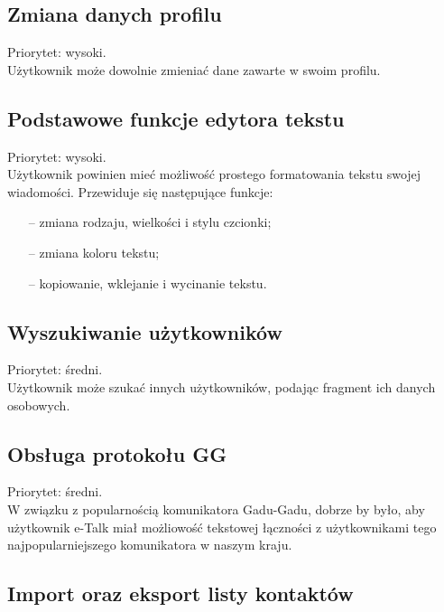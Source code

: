 \documentclass[a4paper,12pt]{article}
\begin{document}
\subsection[Zmiana danych profilu]{Zmiana danych profilu}

Priorytet: wysoki.\\

Użytkownik może dowolnie zmieniać dane zawarte w swoim profilu.

\subsection[Podstawowe funkcje edytora tekstu]{Podstawowe funkcje edytora tekstu}

Priorytet: wysoki.\\

Użytkownik powinien mieć możliwość prostego formatowania tekstu swojej wiadomości.
Przewiduje się następujące funkcje:
\begin{itemize}
    \item[--] zmiana rodzaju, wielkości i stylu czcionki;
    \item[--] zmiana koloru tekstu;
    \item[--] kopiowanie, wklejanie i wycinanie tekstu.
\end{itemize}

\subsection[Wyszukiwanie użytkowników]{Wyszukiwanie użytkowników}
Priorytet: średni.\\

Użytkownik może szukać innych użytkowników, podając fragment ich danych osobowych.

\subsection[Obsługa protokołu GG]{Obsługa protokołu GG}
Priorytet: średni.\\

W związku z popularnością komunikatora Gadu-Gadu, dobrze by było, aby użytkownik e-Talk miał możliowość tekstowej łączności z użytkownikami tego najpopularniejszego komunikatora w naszym kraju.

\subsection[Import oraz eksport listy kontaktów]{Import oraz eksport listy kontaktów}
\end{document}
